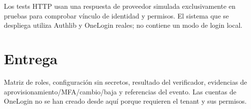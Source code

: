 \documentclass[12pt,a4paper]{article}
\begin{document}
Los tests HTTP usan una respuesta de proveedor simulada exclusivamente en pruebas para comprobar vínculo de identidad y permisos. El sistema que se despliega utiliza Authlib y OneLogin reales; no contiene un modo de login local.\par
{}\section*{Entrega}
Matriz de roles, configuración sin secretos, resultado del verificador, evidencias de aprovisionamiento/MFA/cambio/baja y referencias del evento. Las cuentas de OneLogin no se han creado desde aquí porque requieren el tenant y sus permisos.\par
\end{document}

